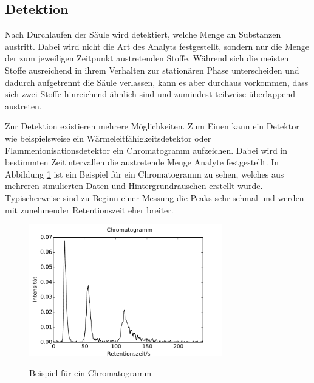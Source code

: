 \subsection{Detektion}
Nach Durchlaufen der Säule wird detektiert, welche Menge an Substanzen austritt. Dabei wird nicht die Art des Analyts festgestellt, sondern nur die Menge der zum jeweiligen Zeitpunkt austretenden Stoffe. Während sich die meisten Stoffe ausreichend in ihrem Verhalten zur stationären Phase unterscheiden und dadurch aufgetrennt die Säule verlassen, kann es aber durchaus vorkommen, dass sich zwei Stoffe hinreichend ähnlich sind und  zumindest teilweise überlappend austreten.

Zur Detektion existieren mehrere Möglichkeiten. Zum Einen kann ein Detektor wie beispielsweise ein Wärmeleitfähigkeitsdetektor oder Flammenionisationsdetektor ein Chromatogramm aufzeichen. Dabei wird in bestimmten Zeitintervallen die austretende Menge Analyte festgestellt. 
In Abbildung \ref{chromatogramm} ist ein Beispiel für ein Chromatogramm zu sehen, welches aus mehreren simulierten Daten und Hintergrundrauschen erstellt wurde.
Typischerweise sind zu Beginn einer Messung die Peaks sehr schmal und werden mit zunehmender Retentionszeit eher breiter.

\begin{figure}
 \centering
  \includegraphics[width = 0.75\textwidth]{bilder/spektrum}\\
  \caption{Beispiel für ein Chromatogramm}
  \label{chromatogramm}
\end{figure}

